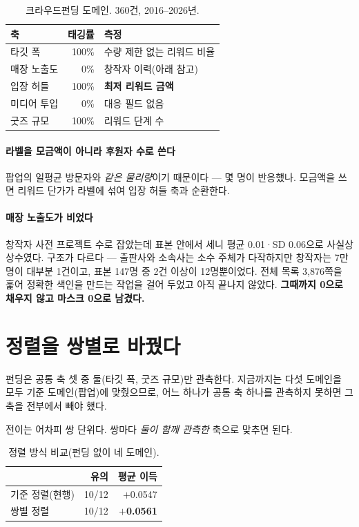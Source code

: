 \documentclass[10pt]{article}
\begin{document}
\begin{table}[t]
\centering\tsize
\caption{크라우드펀딩 도메인. 360건, 2016--2026년.}
\begin{tabular}{lrl}
\toprule
축 & 태깅률 & 측정 \\
\midrule
타깃 폭 & 100\% & 수량 제한 없는 리워드 비율 \\
매장 노출도 & 0\% & 창작자 이력(아래 참고) \\
입장 허들 & 100\% & \textbf{최저 리워드 금액} \\
미디어 투입 & 0\% & 대응 필드 없음 \\
굿즈 규모 & 100\% & 리워드 단계 수 \\
\bottomrule
\end{tabular}
\end{table}

\paragraph{라벨을 모금액이 아니라 후원자 수로 쓴다}
팝업의 일평균 방문자와 \emph{같은 물리량}이기 때문이다 --- 몇 명이 반응했나.
모금액을 쓰면 리워드 단가가 라벨에 섞여 입장 허들 축과 순환한다.

\paragraph{매장 노출도가 비었다}
창작자 사전 프로젝트 수로 잡았는데 표본 안에서 세니 평균 0.01·SD 0.06으로
사실상 상수였다. 구조가 다르다 --- 출판사와 소속사는 소수 주체가 다작하지만
창작자는 7만 명이 대부분 1건이고, 표본 147명 중 2건 이상이 12명뿐이었다.
전체 목록 3,876쪽을 훑어 정확한 색인을 만드는 작업을 걸어 두었고 아직 끝나지
않았다. \textbf{그때까지 0으로 채우지 않고 마스크 0으로 남겼다.}

\section{정렬을 쌍별로 바꿨다}

펀딩은 공통 축 셋 중 둘(타깃 폭, 굿즈 규모)만 관측한다. 지금까지는 다섯
도메인을 모두 기준 도메인(팝업)에 맞췄으므로, 어느 하나가 공통 축 하나를
관측하지 못하면 그 축을 전부에서 빼야 했다.

전이는 어차피 쌍 단위다. 쌍마다 \emph{둘이 함께 관측한} 축으로 맞추면 된다.

\begin{table}[t]
\centering\tsize
\caption{정렬 방식 비교(펀딩 없이 네 도메인).}
\begin{tabular}{lrr}
\toprule
& 유의 & 평균 이득 \\
\midrule
기준 정렬(현행) & 10/12 & $+$0.0547 \\
쌍별 정렬 & 10/12 & \textbf{$+$0.0561} \\
\bottomrule
\end{tabular}
\end{table}
\end{document}
